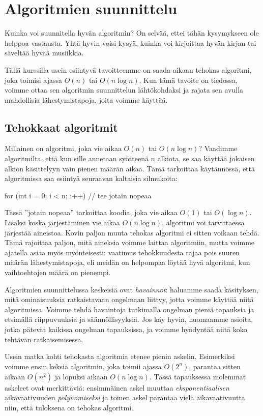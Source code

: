 \chapter{Algoritmien suunnittelu}

Kuinka voi suunnitella hyvän algoritmin?
On selvää, ettei tähän kysymykseen ole helppoa vastausta.
Yhtä hyvin voisi kysyä, kuinka voi kirjoittaa hyvän kirjan
tai säveltää hyvää musiikkia.

Tällä kurssilla usein esiintyvä tavoitteemme on
saada aikaan tehokas algoritmi, joka toimisi ajassa $O(n)$ tai $O(n \log n)$.
Kun tämä tavoite on tiedossa, voimme ottaa sen algoritmin
suunnittelun lähtökohdaksi ja rajata sen avulla mahdollisia
lähestymistapoja, joita voimme käyttää.

\section{Tehokkaat algoritmit}

Millainen on algoritmi, joka vie aikaa $O(n)$ tai $O(n \log n)$?
Vaadimme algoritmilta,
että kun sille annetaan syötteenä $n$ alkiota,
se saa käyttää jokaisen alkion käsittelyyn
vain pienen määrän aikaa.
Tämä tarkoittaa käytännössä, että algoritmissa saa
esiintyä seuraavan kaltaisia silmukoita:

\begin{code}
for (int i = 0; i < n; i++) {
    // tee jotain nopeaa
}
\end{code}

Tässä ''jotain nopeaa'' tarkoittaa koodia, joka vie aikaa
$O(1)$ tai $O(\log n)$.
Lisäksi koska järjestäminen vie aikaa $O(n \log n)$,
algoritmi voi tarvittaessa järjestää aineistoa.
Kovin paljon muuta tehokas algoritmi ei sitten voikaan tehdä.
Tämä rajoittaa paljon, mitä aineksia voimme laittaa algoritmiin,
mutta voimme ajatella asiaa myös myönteisesti:
vaatimus tehokkuudesta rajaa pois suuren määrän lähestymistapoja,
eli meidän on helpompaa löytää hyvä algoritmi,
kun vaihtoehtojen määrä on pienempi.

Algoritmien suunnittelussa keskeisiä ovat \emph{havainnot}:
haluamme saada käsityksen,
mitä ominaisuuksia ratkaistavaan ongelmaan liittyy,
jotta voimme käyttää niitä algoritmissa.
Voimme tehdä havaintoja tutkimalla ongelman pieniä tapauksia
ja etsimällä riippuvuuksia ja säännöllisyyksiä.
Jos käy hyvin, huomaamme asioita, jotka pätevät kaikissa ongelman
tapauksissa, ja voimme hyödyntää niitä koko tehtävän ratkaisemisessa.

Usein matka kohti tehokasta algoritmia etenee pienin askelin.
Esimerkiksi voimme ensin keksiä algoritmin, joka toimii ajassa $O(2^n)$,
parantaa sitten aikaan $O(n^2)$ ja lopuksi aikaan $O(n \log n)$.
Tässä tapauksessa molemmat askeleet ovat merkittäviä:
ensimmäinen askel muuttaa \emph{eksponentiaalisen} aikavaativuuden
\emph{polynomiseksi} ja toinen askel parantaa vielä aikavaativuutta niin,
että tuloksena on tehokas algoritmi.

